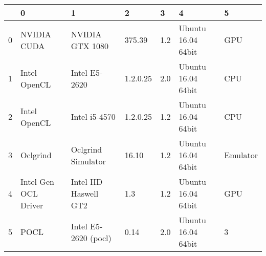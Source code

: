 \begin{tabular}{lllllll}
\toprule
{} &                     0 &                     1 &         2 &    3 &                   4 &         5 \\
\midrule
0 &           NVIDIA CUDA &       NVIDIA GTX 1080 &    375.39 &  1.2 &  Ubuntu 16.04 64bit &       GPU \\
1 &          Intel OpenCL &         Intel E5-2620 &  1.2.0.25 &  2.0 &  Ubuntu 16.04 64bit &       CPU \\
2 &          Intel OpenCL &         Intel i5-4570 &  1.2.0.25 &  1.2 &  Ubuntu 16.04 64bit &       CPU \\
3 &              Oclgrind &    Oclgrind Simulator &     16.10 &  1.2 &  Ubuntu 16.04 64bit &  Emulator \\
4 &  Intel Gen OCL Driver &  Intel HD Haswell GT2 &       1.3 &  1.2 &  Ubuntu 16.04 64bit &       GPU \\
5 &                  POCL &  Intel E5-2620 (pocl) &      0.14 &  2.0 &  Ubuntu 16.04 64bit &         3 \\
\bottomrule
\end{tabular}
